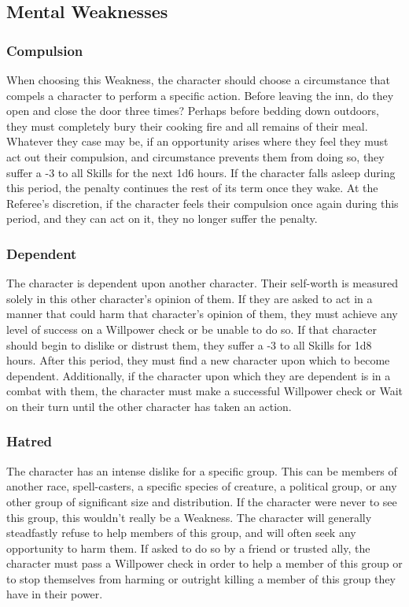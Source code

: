\documentclass[oneside]{book}
\begin{document}
\begin{multicols}{2}
\section{Mental Weaknesses}
\subsubsection{Compulsion}
When choosing this Weakness, the character should choose a circumstance that compels a character to perform a specific action. Before leaving the inn, do they open and close the door three times? Perhaps before bedding down outdoors, they must completely bury their cooking fire and all remains of their meal. Whatever they case may be, if an opportunity arises where they feel they must act out their compulsion, and circumstance prevents them from doing so, they suffer a -3 to all Skills for the next 1d6 hours. If the character falls asleep during this period, the penalty continues the rest of its term once they wake. At the Referee's discretion, if the character feels their compulsion once again during this period, and they can act on it, they no longer suffer the penalty. 

\subsubsection{Dependent}
The character is dependent upon another character. Their self-worth is measured solely in this other character's opinion of them. If they are asked to act in a manner that could harm that character's opinion of them, they must achieve any level of success on a Willpower check or be unable to do so. If that character should begin to dislike or distrust them, they suffer a -3 to all Skills for 1d8 hours. After this period, they must find a new character upon which to become dependent. Additionally, if the character upon which they are dependent is in a combat with them, the character must make a successful Willpower check or Wait on their turn until the other character has taken an action. 

\subsubsection{Hatred}
The character has an intense dislike for a specific group. This can be members of another race, spell-casters, a specific species of creature, a political group, or any other group of significant size and distribution. If the character were never to see this group, this wouldn't really be a Weakness. The character will generally steadfastly refuse to help members of this group, and will often seek any opportunity to harm them. If asked to do so by a friend or trusted ally, the character must pass a Willpower check in order to help a member of this group or to stop themselves from harming or outright killing a member of this group they have in their power.


\end{multicols}
\end{document}
